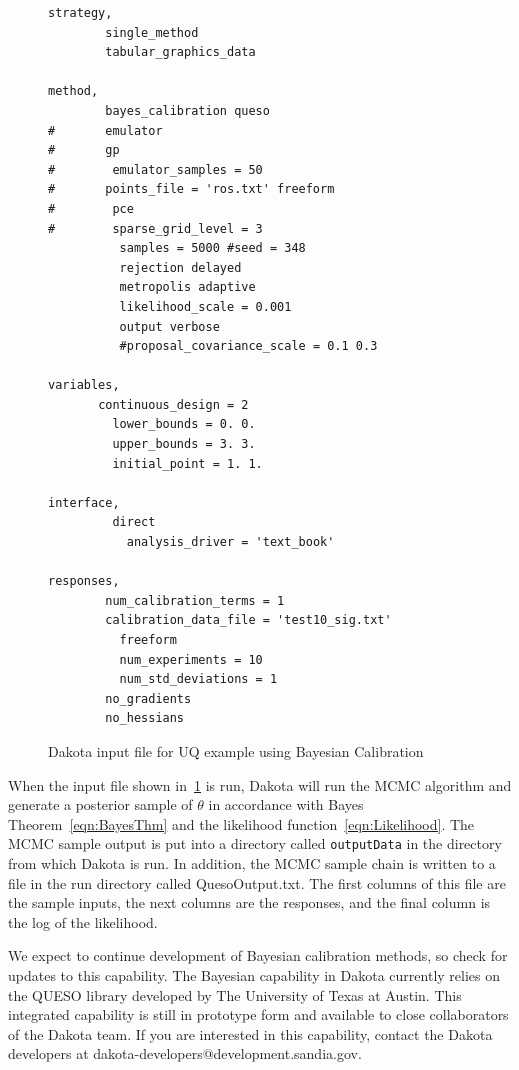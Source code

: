 \begin{figure}
\centering
\begin{bigbox}
\begin{small}
\begin{verbatim}
strategy,
        single_method
        tabular_graphics_data

method,
        bayes_calibration queso
#       emulator
#       gp
#        emulator_samples = 50
#       points_file = 'ros.txt' freeform
#        pce 
#        sparse_grid_level = 3 
          samples = 5000 #seed = 348                                    
          rejection delayed
          metropolis adaptive
          likelihood_scale = 0.001
          output verbose
          #proposal_covariance_scale = 0.1 0.3
 
variables,
       continuous_design = 2
         lower_bounds = 0. 0.
         upper_bounds = 3. 3.
         initial_point = 1. 1.

interface,
         direct 
           analysis_driver = 'text_book'

responses,
        num_calibration_terms = 1
        calibration_data_file = 'test10_sig.txt'
          freeform
          num_experiments = 10
          num_std_deviations = 1
        no_gradients
        no_hessians
\end{verbatim}
\end{small}
\end{bigbox}
\caption{Dakota input file for UQ example using Bayesian Calibration}
\label{uq:figure18}
\end{figure}

When the input file shown in~\ref{uq:figure18} is run, 
Dakota will run the MCMC algorithm and generate a posterior sample of 
$\theta$ in accordance with Bayes Theorem~\ref{eqn:BayesThm} and 
the likelihood function~\ref{eqn:Likelihood}. The MCMC sample output 
is put into a directory called \texttt{outputData} in the directory 
from which Dakota is run. In addition, the MCMC sample chain is 
written to a file in the run directory called QuesoOutput.txt. 
The first columns of this file are the sample inputs, the next columns 
are the responses, and the final column is the  log of the 
likelihood.

We expect to continue development of Bayesian calibration methods, 
so check for updates to this capability. The Bayesian capability 
in Dakota currently relies on the QUESO library developed by The University of 
Texas at Austin. This integrated capability is still in prototype form and 
available to close collaborators of the Dakota team.
If you are interested in this capability, contact the Dakota developers at  
dakota-developers@development.sandia.gov.
  
